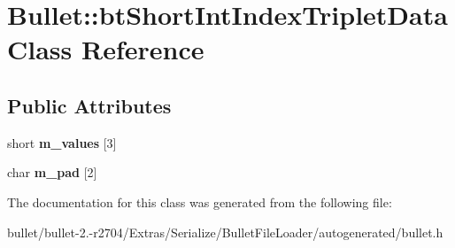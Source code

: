 \hypertarget{class_bullet_1_1bt_short_int_index_triplet_data}{\section{Bullet\+:\+:bt\+Short\+Int\+Index\+Triplet\+Data Class Reference}
\label{class_bullet_1_1bt_short_int_index_triplet_data}
}
\subsection*{Public Attributes}
\begin{DoxyCompactItemize}
\item 
\hypertarget{class_bullet_1_1bt_short_int_index_triplet_data_ae56cecaf4fe991d392c98e093bb08752}{short {\bfseries m\+\_\+values} \mbox{[}3\mbox{]}}\label{class_bullet_1_1bt_short_int_index_triplet_data_ae56cecaf4fe991d392c98e093bb08752}

\item 
\hypertarget{class_bullet_1_1bt_short_int_index_triplet_data_a887d349d3320307037b46d2c7fc989e5}{char {\bfseries m\+\_\+pad} \mbox{[}2\mbox{]}}\label{class_bullet_1_1bt_short_int_index_triplet_data_a887d349d3320307037b46d2c7fc989e5}

\end{DoxyCompactItemize}


The documentation for this class was generated from the following file\+:\begin{DoxyCompactItemize}
\item 
bullet/bullet-\/2.-\/r2704/\+Extras/\+Serialize/\+Bullet\+File\+Loader/autogenerated/bullet.\+h\end{DoxyCompactItemize}
